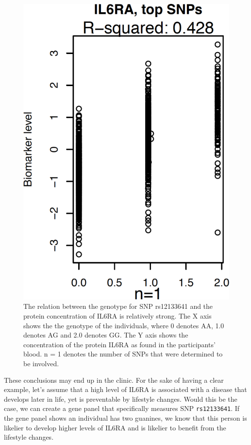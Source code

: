 \begin{figure}[!htbp]
  \centering
  \includegraphics[width=\linewidth]{ahsan2017relative_s6.png}
  \caption{
    The relation between the genotype for SNP rs12133641 
    and the protein concentration of IL6RA is relatively strong.
    The X axis shows the the genotype of the individuals,
    where 0 denotes AA, 1.0 denotes AG and 2.0 denotes GG.
    The Y axis shows the concentration of the protein IL6RA 
    as found in the participants' blood. n = 1 denotes the number
    of SNPs that were determined to be involved.
  }
  \label{fig:ahsan2017relative_s6}
\end{figure}

These conclusions may end up in the clinic.
For the sake of having a clear example,
let's assume that a high level of IL6RA 
is associated with a disease that develops later in life,
yet is preventable by lifestyle changes.
Would this be the case, we can create a gene panel that specifically measures
SNP \verb|rs12133641|. 
If the gene panel shows an individual has two guanines, 
we know that this person is likelier to develop higher levels of
IL6RA and is likelier to benefit from the lifestyle changes.

